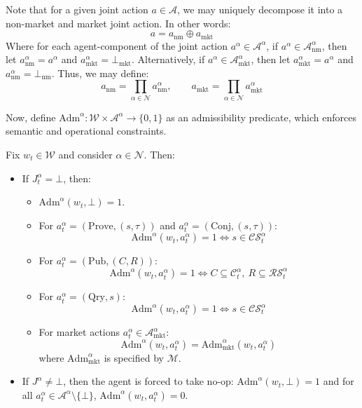 Note that for a  given joint action $a \in \mathcal{A}$, we may uniquely decompose it into a non-market and market joint action. In other words:
\[a = a_{\mathrm{nm}} \oplus a_{\mathrm{mkt}}\]
Where for each agent-component of the joint action $a^\alpha \in \mathcal{A}^\alpha$, if $a^\alpha \in \mathcal{A}^\alpha_{\mathrm{nm}}$, then let $a^\alpha_{\mathrm{nm}} = a^\alpha$ and $a^\alpha_{\mathrm{mkt}} = \bot_{\mathrm{mkt}}$. Alternatively, if $a^\alpha \in \mathcal{A}^\alpha_{\mathrm{mkt}}$, then let $a^\alpha_{\mathrm{mkt}} = a^\alpha$ and $a^\alpha_{\mathrm{nm}} = \bot_{\mathrm{nm}}$. Thus, we may define:
\[a_{\mathrm{nm}} = \prod_{\alpha \in \mathcal{N}} a^\alpha_{\mathrm{nm}},\qquad a_{\mathrm{mkt}} = \prod_{\alpha \in \mathcal{N}} a^\alpha_{\mathrm{mkt}}\]




Now, define $\mathrm{Adm}^\alpha:\mathcal{W}\times\mathcal{A}^\alpha\to\{0,1\}$ as an admissibility predicate, which enforces semantic and operational constraints. 

Fix $w_t \in \mathcal{W}$ and consider $\alpha \in \mathcal{N}$. Then:
\begin{itemize}
    \item If $J^\alpha_t=\bot$, then:
\begin{itemize}
\item $\mathrm{Adm}^\alpha(w_t,\bot)=1$.
\item For $a^\alpha_t = (\mathrm{Prove},(s,\tau))$ and $a^\alpha_t = (\mathrm{Conj},(s,\tau))$:
\[
\mathrm{Adm}^\alpha(w_t,a^\alpha_t)=1 \iff s \in \mathcal{CS}_t^\alpha
\]
\item For $a^\alpha_t = (\mathrm{Pub},(C,R))$: \[\mathrm{Adm}^\alpha(w_t,a^\alpha_t)=1 \iff C\subseteq\mathcal{C}_t^\alpha,\ R\subseteq\mathcal{RS}_t^\alpha\]
\item For $a^\alpha_t = (\mathrm{Qry},s)$: 
\[\mathrm{Adm}^\alpha(w_t,a_t^\alpha)=1 \iff s \in \mathcal{CS}_t^\alpha\]
\item For market actions $a^\alpha_t\in\mathcal{A}^\alpha_{\mathrm{mkt}}$:
\[
\mathrm{Adm}^\alpha(w_t,a^\alpha_t)= \mathrm{Adm}^\alpha_{\mathrm{mkt}}(w_t,a^\alpha_t) 
\]
where $\mathrm{Adm}_{\mathrm{mkt}}^\alpha$ is specified by $\mathscr{M}$.
\end{itemize}

\item If $J^\alpha\neq\bot$, then the agent is forced to take no-op: $\mathrm{Adm}^\alpha(w_t,\bot)=1$ and for all $a^\alpha_t\in \mathcal{A}^\alpha\setminus\{\bot\}$, $\mathrm{Adm}^\alpha(w_t,a^\alpha_t)=0$.
\end{itemize}


